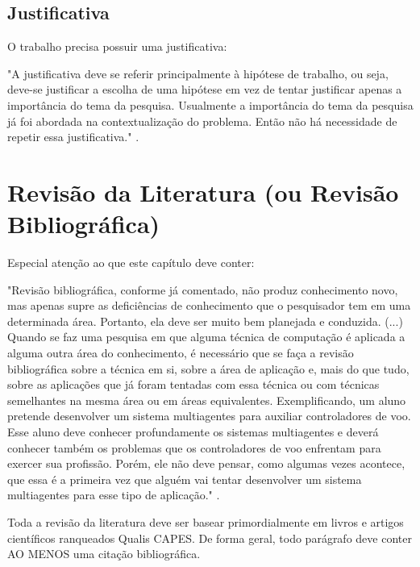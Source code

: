 \documentclass[
	article,			%
	12pt,				%
	oneside,			%
	a4paper,			%
	english,			%
	brazil,				%
	sumario=tradicional
	]{abntex2}
\begin{document}
\subsection{Justificativa}    

    O trabalho precisa possuir uma justificativa:
    \begin{citacao}
    "A justificativa deve se referir principalmente à hipótese de trabalho, ou seja, deve-se justificar a escolha de uma
    hipótese em vez de tentar justificar apenas a importância do tema da pesquisa. Usualmente a importância do
    tema da pesquisa já foi abordada na contextualização do problema. Então não há necessidade de repetir essa
    justificativa."
    \lipsum[5] \cite{PESQUISA:RAUL}.
    \end{citacao}


\section{Revisão da Literatura (ou Revisão Bibliográfica)}

Especial atenção ao que este capítulo deve conter:
    \begin{citacao}
    "Revisão bibliográfica, conforme já comentado, não produz conhecimento novo, mas apenas supre as
    deficiências de conhecimento que o pesquisador tem em uma determinada área. Portanto, ela deve ser muito
    bem planejada e conduzida.
    (...)
    Quando se faz uma pesquisa em que alguma técnica de computação é aplicada a alguma outra área do
    conhecimento, é necessário que se faça a revisão bibliográfica sobre a técnica em si, sobre a área de aplicação e,
    mais do que tudo, sobre as aplicações que já foram tentadas com essa técnica ou com técnicas semelhantes na
    mesma área ou em áreas equivalentes. Exemplificando, um aluno pretende desenvolver um sistema
    multiagentes para auxiliar controladores de voo. Esse aluno deve conhecer profundamente os sistemas
    multiagentes e deverá conhecer também os problemas que os controladores de voo enfrentam para exercer sua
    profissão. Porém, ele não deve pensar, como algumas vezes acontece, que essa é a primeira vez que alguém vai
    tentar desenvolver um sistema multiagentes para esse tipo de aplicação."
    \cite{PESQUISA:RAUL}.
    \end{citacao}

Toda a revisão da literatura deve ser basear primordialmente em livros e artigos científicos ranqueados Qualis CAPES. De forma geral, todo parágrafo deve conter AO MENOS uma citação bibliográfica.
\end{document}
